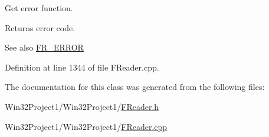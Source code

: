 Get error function. 

\begin{DoxyReturn}{Returns}
error code. 
\end{DoxyReturn}
\begin{DoxySeeAlso}{See also}
\hyperlink{_file_structs_8h_ae183556f32e14e06d49b270ca950d90a}{F\+R\+\_\+\+E\+R\+R\+OR} 
\end{DoxySeeAlso}


Definition at line 1344 of file F\+Reader.\+cpp.



The documentation for this class was generated from the following files\+:\begin{DoxyCompactItemize}
\item 
Win32\+Project1/\+Win32\+Project1/\hyperlink{_f_reader_8h}{F\+Reader.\+h}\item 
Win32\+Project1/\+Win32\+Project1/\hyperlink{_f_reader_8cpp}{F\+Reader.\+cpp}\end{DoxyCompactItemize}
